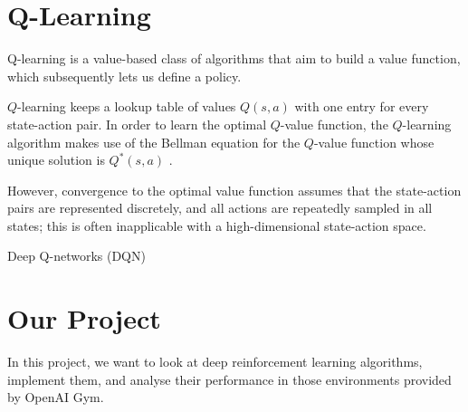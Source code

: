 \documentclass{article}
\begin{document}
\section{Q-Learning}
Q-learning is a value-based class of algorithms that aim to build a value function, which subsequently lets us define a policy.

$Q$-learning keeps a lookup table of values $Q(s,a)$ with one entry for every state-action pair. In order to learn the optimal $Q$-value function, the $Q$-learning algorithm makes use of the Bellman equation for the $Q$-value function whose unique solution is $Q^*(s,a)$ \cite{DBLP:journals/corr/abs-1811-12560}.

However, convergence to the optimal value function assumes that the state-action pairs are represented discretely, and all actions are repeatedly sampled in all states; this is often inapplicable with a high-dimensional state-action space.

Deep Q-networks (DQN)

\section{Our Project}

In this project, we want to look at deep reinforcement learning algorithms, implement them, and analyse their performance in those environments provided by OpenAI Gym.

\printbibliography
\end{document}
